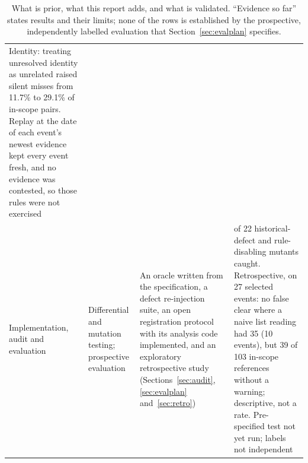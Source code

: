 \documentclass[11pt,a4paper]{article}
\begin{document}
\begin{table}[t]
\begin{tabularx}{\linewidth}{@{}>{\raggedright\arraybackslash}p{2.4cm} >{\raggedright\arraybackslash}p{2.4cm} >{\raggedright\arraybackslash}X >{\raggedright\arraybackslash}p{3.3cm}@{}}
  Identity: treating unresolved identity as unrelated raised silent
  misses from 11.7\% to 29.1\% of in-scope pairs. Replay at the date
  of each event's newest evidence kept every event fresh, and no evidence was
  contested, so those rules were not exercised \\
Implementation, audit and evaluation &
  Differential and mutation testing; prospective evaluation &
  An oracle written from the specification, a defect re-injection
  suite, an open registration protocol with its analysis code
  implemented, and
  an exploratory retrospective study
  (Sections~\ref{sec:audit}, \ref{sec:evalplan} and~\ref{sec:retro}) &
  22 of 22 historical-defect and rule-disabling mutants caught.
  Retrospective, on 27 selected events: no false clear where a naive
  list reading had 35 (10 events), but 39 of 103 in-scope references
  without a warning; descriptive, not a rate. Pre-specified test not
  yet run; labels not independent \\
\bottomrule
\end{tabularx}
\caption{What is prior, what this report adds, and what is validated.
``Evidence so far'' states results and their limits; none of the rows
is established by the prospective, independently labelled evaluation
that Section~\ref{sec:evalplan} specifies.}
\label{tab:novelty}
\end{table}
\end{document}
